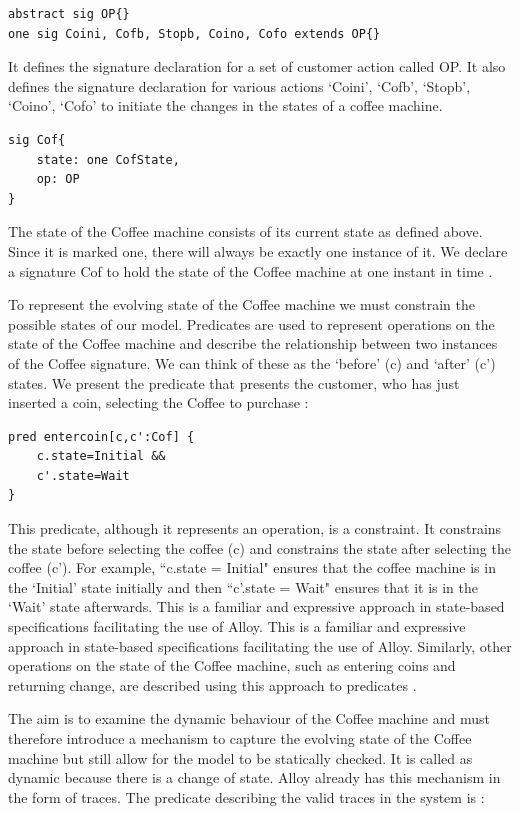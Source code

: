 \documentclass[a4paper,12pt]{report}
\begin{document}
\begin{onehalfspacing}
\begin{verbatim}
abstract sig OP{}
one sig Coini, Cofb, Stopb, Coino, Cofo extends OP{}
\end{verbatim}

It defines the signature declaration for a set of customer action called OP. It also defines the signature declaration for various actions `Coini', `Cofb', `Stopb', `Coino', `Cofo' to initiate the changes in the states of a coffee machine.

\begin{verbatim}
sig Cof{
	state: one CofState,
	op: OP
}
\end{verbatim}

The state of the Coffee machine consists of its current state as defined above. Since it is marked one, there will always be exactly one instance of it. We declare a signature Cof to hold the state of the Coffee machine at one instant in time \cite{RussellBoyatt}.

To represent the evolving state of the Coffee machine we must constrain the possible states of our model. Predicates are used to represent operations on the state of the Coffee machine and describe the relationship between two instances of the Coffee signature. We can think of these as the `before' (c) and `after' (c') states. We present the predicate that presents the customer, who has just inserted a coin, selecting the Coffee to purchase \cite{RussellBoyatt}:

\begin{verbatim}
pred entercoin[c,c':Cof] {
	c.state=Initial &&
	c'.state=Wait
}

\end{verbatim}

This predicate, although it represents an operation, is a constraint. It constrains the state before selecting the coffee (c) and constrains the state after selecting the coffee (c'). For example, ``c.state = Initial" ensures that the coffee machine is in the `Initial’ state initially and then ``c'.state = Wait" ensures that it is in the `Wait' state afterwards. This is a familiar and expressive approach in state-based specifications facilitating the use of Alloy. This is a familiar and expressive approach in state-based specifications facilitating the use of Alloy. Similarly, other operations on the state of the Coffee machine, such as entering coins and returning change, are described using this approach to predicates \cite{RussellBoyatt}.

The aim is to examine the dynamic behaviour of the Coffee machine and must therefore introduce a mechanism to capture the evolving state of the Coffee machine but still allow for the model to be statically checked. It is called as dynamic because there is a change of state. Alloy already has this mechanism in the form of traces. The predicate describing the valid traces in the system is \cite{RussellBoyatt}:


\end{onehalfspacing}
\end{document}

